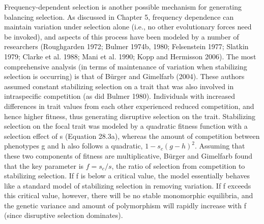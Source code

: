 \documentclass{article}
\begin{document}
Frequency-dependent selection is another possible mechanism for generating balancing selection. As discussed in Chapter 5, frequency dependence can maintain variation under selection alone (i.e., no other evolutionary forces need be invoked), and aspects of this process have been modeled by a number of researchers (Roughgarden 1972; Bulmer 1974b, 1980; Felsenstein 1977; Slatkin 1979; Clarke et al. 1988; Mani et al. 1990; Kopp and Hermisson 2006). The most comprehensive analysis (in terms of maintenance of variation when stabilizing selection is occurring) is that of Bürger and Gimelfarb (2004). These authors assumed constant stabilizing selection on a trait that was also involved in intraspecific competition (as did Bulmer 1980). Individuals with increased differences in trait values from each other experienced reduced competition, and hence higher fitness, thus generating disruptive selection on the trait. Stabilizing selection on the focal trait was modeled by a quadratic fitness function with a selection effect of s (Equation 28.3a), whereas the amount of competition between phenotypes g and h also follows a quadratic,  $ 1 - s_c(g - h)^2 $. Assuming that these two components of fitness are multiplicative, Bürger and Gimelfarb found that the key parameter is  $ f = s_c / s $, the ratio of selection from competition to stabilizing selection. If f is below a critical value, the model essentially behaves like a standard model of stabilizing selection in removing variation. If f exceeds this critical value, however, there will be no stable monomorphic equilibria, and the genetic variance and amount of polymorphism will rapidly increase with f (since disruptive selection dominates).
\end{document}
